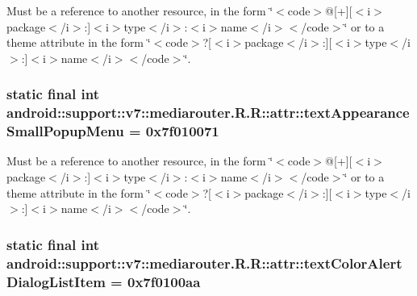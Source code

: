 Must be a reference to another resource, in the form \char`\"{}$<$code$>$@\mbox{[}+\mbox{]}\mbox{[}$<$i$>$package$<$/i$>$:\mbox{]}$<$i$>$type$<$/i$>$:$<$i$>$name$<$/i$>$$<$/code$>$\char`\"{} or to a theme attribute in the form \char`\"{}$<$code$>$?\mbox{[}$<$i$>$package$<$/i$>$:\mbox{]}\mbox{[}$<$i$>$type$<$/i$>$:\mbox{]}$<$i$>$name$<$/i$>$$<$/code$>$\char`\"{}. \hypertarget{classandroid_1_1support_1_1v7_1_1mediarouter_1_1_r_1_1attr_b4b21bf5fda61523e44b5e6cffd6fb3a}{
\subsubsection[{textAppearanceSmallPopupMenu}]{\setlength{\rightskip}{0pt plus 5cm}static final int android::support::v7::mediarouter.R.R::attr::textAppearanceSmallPopupMenu = 0x7f010071}}
\label{classandroid_1_1support_1_1v7_1_1mediarouter_1_1_r_1_1attr_b4b21bf5fda61523e44b5e6cffd6fb3a}


Must be a reference to another resource, in the form \char`\"{}$<$code$>$@\mbox{[}+\mbox{]}\mbox{[}$<$i$>$package$<$/i$>$:\mbox{]}$<$i$>$type$<$/i$>$:$<$i$>$name$<$/i$>$$<$/code$>$\char`\"{} or to a theme attribute in the form \char`\"{}$<$code$>$?\mbox{[}$<$i$>$package$<$/i$>$:\mbox{]}\mbox{[}$<$i$>$type$<$/i$>$:\mbox{]}$<$i$>$name$<$/i$>$$<$/code$>$\char`\"{}. \hypertarget{classandroid_1_1support_1_1v7_1_1mediarouter_1_1_r_1_1attr_9a5f3bde62833f577619e27f7dd000d1}{
\subsubsection[{textColorAlertDialogListItem}]{\setlength{\rightskip}{0pt plus 5cm}static final int android::support::v7::mediarouter.R.R::attr::textColorAlertDialogListItem = 0x7f0100aa}}
\label{classandroid_1_1support_1_1v7_1_1mediarouter_1_1_r_1_1attr_9a5f3bde62833f577619e27f7dd000d1}


